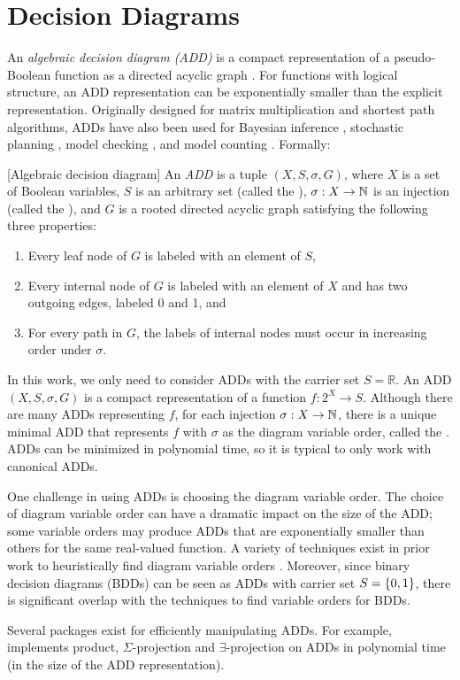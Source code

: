 \section{Decision Diagrams}
\label{sec:background:dd}
An \emph{algebraic decision diagram (ADD)} is a compact representation of a pseudo-Boolean function as a directed acyclic graph \cite{bahar1997algebraic}.
For functions with logical structure, an ADD representation can be exponentially smaller than the explicit representation.
Originally designed for matrix multiplication and shortest path algorithms, ADDs have also been used for Bayesian inference \cite{chavira2007compiling,gogate2011approximation}, stochastic planning \cite{hoey1999spudd}, model checking \cite{kwiatkowska2007stochastic}, and model counting \cite{fargier2014knowledge,DPV20}. Formally:

\begin{definition}
\label{def:add}[Algebraic decision diagram]
An \emph{ADD} is a tuple $(X, S, \sigma, G)$, where $X$ is a set of Boolean variables, $S$ is an arbitrary set (called the ), $\sigma: X \to \mathbb{N}$ is an injection (called the ), and $G$ is a rooted directed acyclic graph satisfying the following three properties:
\begin{enumerate}
    \item Every leaf node of $G$ is labeled with an element of $S$,
    \item Every internal node of $G$ is labeled with an element of $X$ and has two outgoing edges, labeled 0 and 1, and
    \item For every path in $G$, the labels of internal nodes must occur in increasing order under $\sigma$.
\end{enumerate}
\end{definition}
In this work, we only need to consider ADDs with the carrier set $S = \mathbb{R}$. 
An ADD $(X, S, \sigma, G)$ is a compact representation of a function $f: 2^X \to S$.
Although there are many ADDs representing $f$, for each injection $\sigma: X \to \mathbb{N}$, there is a unique minimal ADD that represents $f$ with $\sigma$ as the diagram variable order, called the .
ADDs can be minimized in polynomial time, so it is typical to only work with canonical ADDs.

One challenge in using ADDs is choosing the diagram variable order.
The choice of diagram variable order can have a dramatic impact on the size of the ADD; some variable orders may produce ADDs that are exponentially smaller than others for the same real-valued function.
A variety of techniques exist in prior work to heuristically find diagram variable orders \cite{tarjan1984simple,koster2001treewidth,dechter03}.
Moreover, since binary decision diagrams (BDDs) \cite{bryant1986graph} can be seen as ADDs with carrier set $S = \left\{ 0, 1 \right\}$, there is significant overlap with the techniques to find variable orders for BDDs.

Several packages exist for efficiently manipulating ADDs.
For example, \cudd{} \cite{somenzi2015cudd} implements product, $\Sigma$-projection and $\exists$-projection on ADDs in polynomial time (in the size of the ADD representation).